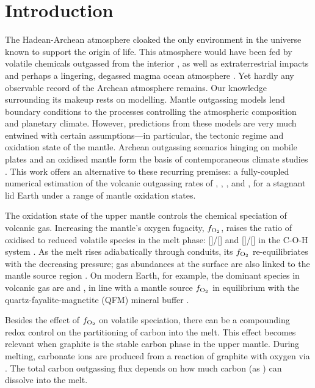 \documentclass[3p,authoryear]{elsarticle}
\begin{document}
\section{Introduction}

The Hadean-Archean atmosphere cloaked the only environment in the universe known to support the origin of life. This atmosphere would have been fed by volatile chemicals outgassed from the interior \citep{Holland1984, Kasting1993, Gaillard2014}, as well as extraterrestrial impacts \citep{Zahnle2020} and perhaps a lingering, degassed magma ocean atmosphere \citep{Katyal2020}. Yet hardly any observable record of the Archean atmosphere remains. Our knowledge surrounding its makeup rests on modelling. Mantle outgassing models lend boundary conditions to the processes controlling the atmospheric composition and planetary climate. However, predictions from these models are very much entwined with certain assumptions---in particular, the tectonic regime and oxidation state of the mantle. Archean outgassing scenarios hinging on mobile plates and an oxidised mantle form the basis of contemporaneous climate studies \citep[e.g.,][]{Sleep2001}. This work offers an alternative to these recurring premises: a fully-coupled numerical estimation of the volcanic outgassing rates of , , , and , for a stagnant lid Earth under a range of mantle oxidation states. 

The oxidation state of the upper mantle controls the chemical speciation of volcanic gas. Increasing the mantle's oxygen fugacity, $f_{\rm O_2}$, raises the ratio of oxidised to reduced volatile species in the melt phase: []/[] and []/[] in the C-O-H system \citep{Holland1984}. As the melt rises adiabatically through conduits, its $f_{\rm O_2}$ re-equilibriates with the decreasing pressure; gas abundances at the surface are also linked to the mantle source region \citep{Kasting1993}. On modern Earth, for example, the dominant species in volcanic gas are  and , in line with a mantle source $f_{\rm{O_2}}$ in equilibrium with the quartz-fayalite-magnetite (QFM) mineral buffer \citep{Holland1984}. 

Besides the effect of $f_{\rm{O_2}}$ on volatile speciation, there can be a compounding redox control on the partitioning of carbon into the melt. This effect becomes relevant when graphite is the stable carbon phase in the upper mantle. During melting, carbonate ions are produced from a reaction of graphite with oxygen via  \citep{Holloway1992}. The total carbon outgassing flux depends on how much carbon (as ) can dissolve into the melt. 
\end{document}
